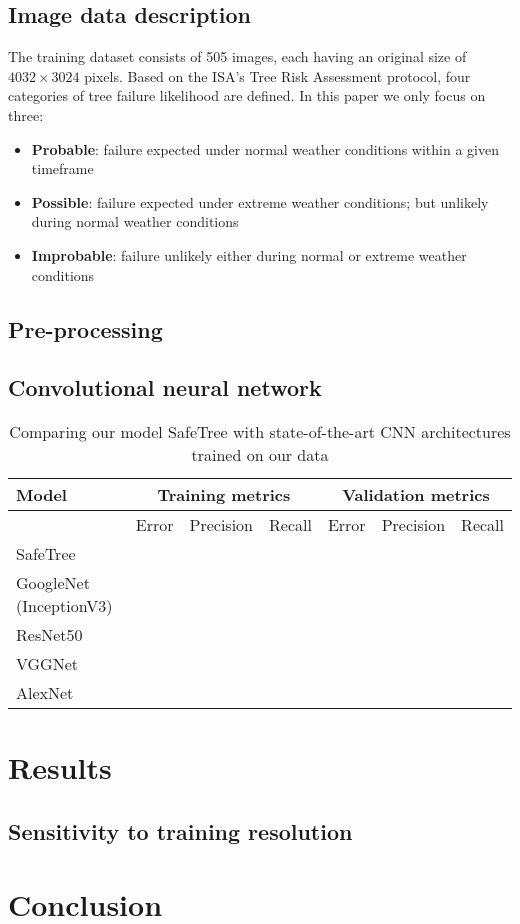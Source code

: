 \documentclass[11pt,twoside]{article}
\numberwithin{equation}{section}
\newcommand{\?}{\stackrel{?}{=}}
\begin{document}
\subsection{Image data description}
The training dataset consists of 505 images, each having an original size of $4032\times3024$ pixels. 
Based on the  ISA’s Tree Risk Assessment protocol, four categories of tree failure likelihood are defined. In this paper we only focus on three:
\begin{itemize}
\item \textbf{Probable}: failure expected under normal weather conditions within a given timeframe
\item \textbf{Possible}: failure expected under extreme weather conditions; but unlikely during normal weather conditions
\item \textbf{Improbable}: failure unlikely either during normal or extreme weather conditions 
\end{itemize}

\subsection{Pre-processing}

\subsection{Convolutional neural network}


\begin{table}[h!]
  \centering
  \begin{tabular}{l l l l l l l }\toprule
    \bf Model & \multicolumn{3}{c}{\bf Training metrics} &\multicolumn{3}{c}{\bf Validation metrics}  \\\midrule
    & Error & Precision & Recall     & Error & Precision & Recall \\
    SafeTree & & & & & & \\
    GoogleNet (InceptionV3) & & & & & & \\
    ResNet50 & & & & & & \\
        VGGNet & & & & & & \\
    AlexNet & & & & & & \\\bottomrule
  \end{tabular}
  \caption{Comparing our model SafeTree with state-of-the-art CNN architectures trained on our data}
  \label{tab:comp}
\end{table}


\section{Results}

\subsection{Sensitivity to training resolution}

\section{Conclusion}

\printbibliography

\appendix
\end{document}
